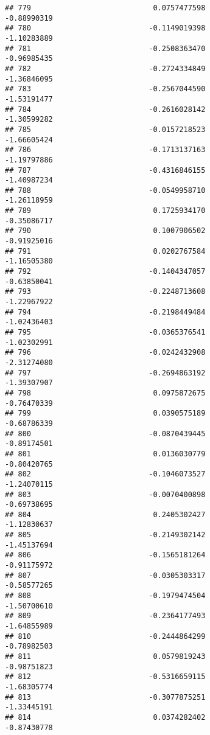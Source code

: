 \documentclass[
]{article}
\begin{document}
\begin{verbatim}
## 779                            0.0757477598                -0.88990319
## 780                           -0.1149019398                -1.10283889
## 781                           -0.2508363470                -0.96985435
## 782                           -0.2724334849                -1.36846095
## 783                           -0.2567044590                -1.53191477
## 784                           -0.2616028142                -1.30599282
## 785                           -0.0157218523                -1.66605424
## 786                           -0.1713137163                -1.19797886
## 787                           -0.4316846155                -1.40987234
## 788                           -0.0549958710                -1.26118959
## 789                            0.1725934170                -0.35086717
## 790                            0.1007906502                -0.91925016
## 791                            0.0202767584                -1.16505380
## 792                           -0.1404347057                -0.63850041
## 793                           -0.2248713608                -1.22967922
## 794                           -0.2198449484                -1.02436403
## 795                           -0.0365376541                -1.02302991
## 796                           -0.0242432908                -2.31274080
## 797                           -0.2694863192                -1.39307907
## 798                            0.0975872675                -0.76470339
## 799                            0.0390575189                -0.68786339
## 800                           -0.0870439445                -0.89174501
## 801                            0.0136030779                -0.80420765
## 802                           -0.1046073527                -1.24070115
## 803                           -0.0070400898                -0.69738695
## 804                            0.2405302427                -1.12830637
## 805                           -0.2149302142                -1.45137694
## 806                           -0.1565181264                -0.91175972
## 807                           -0.0305303317                -0.58577265
## 808                           -0.1979474504                -1.50700610
## 809                           -0.2364177493                -1.64855989
## 810                           -0.2444864299                -0.78982503
## 811                            0.0579819243                -0.98751823
## 812                           -0.5316659115                -1.68305774
## 813                           -0.3077875251                -1.33445191
## 814                            0.0374282402                -0.87430778

\end{verbatim}
\end{document}
